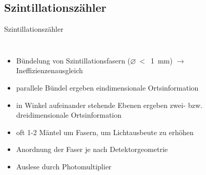 
	
\subsection[]{Szintillationszähler}



\begin{frame}{Szintillationszähler}
	\begin{columns}[T]
			\begin{itemize}
			  \item Bündelung von Szintillationsfasern ($\varnothing~<$~1~mm) $\rightarrow$
			  Ineffizienzenausgleich
			  \item parallele Bündel ergeben eindimensionale Ortsinformation
			  \item in Winkel aufeinander stehende Ebenen ergeben zwei- bzw. dreidimensionale Ortsinformation
			  \item oft 1-2 Mäntel um Fasern, um Lichtausbeute zu erhöhen
			  \item Anordnung der Faser je nach Detektorgeometrie
			  \item Auslese durch Photomultiplier
			\end{itemize}	
	    	\begin{figure}[htbp]
			  \centering
			  
			\end{figure}
    \end{columns}
\end{frame}	

